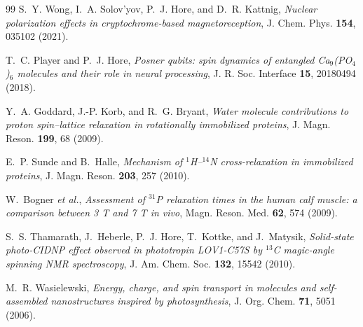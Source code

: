 \documentclass[aps,prx,reprint,superscriptaddress,nofootinbib,floatfix]{revtex4-2}
\begin{document}
\begin{thebibliography}{99}
 S.~Y. Wong, I.~A. Solov'yov, P.~J. Hore, and D.~R. Kattnig,
\textit{Nuclear polarization effects in cryptochrome-based magnetoreception},
J. Chem. Phys. \textbf{154}, 035102 (2021).

 T.~C. Player and P.~J. Hore,
\textit{Posner qubits: spin dynamics of entangled Ca$_9$(PO$_4$)$_6$ molecules
and their role in neural processing},
J. R. Soc. Interface \textbf{15}, 20180494 (2018).

 Y.~A. Goddard, J.-P. Korb, and R.~G. Bryant,
\textit{Water molecule contributions to proton spin--lattice relaxation in
rotationally immobilized proteins},
J. Magn. Reson. \textbf{199}, 68 (2009).

 E.~P. Sunde and B.~Halle,
\textit{Mechanism of $^1$H--$^{14}$N cross-relaxation in immobilized proteins},
J. Magn. Reson. \textbf{203}, 257 (2010).

 W.~Bogner \textit{et al.},
\textit{Assessment of $^{31}$P relaxation times in the human calf muscle: a
comparison between 3 T and 7 T in vivo},
Magn. Reson. Med. \textbf{62}, 574 (2009).

 S.~S. Thamarath, J.~Heberle, P.~J. Hore, T.~Kottke, and
J.~Matysik,
\textit{Solid-state photo-CIDNP effect observed in phototropin LOV1-C57S by
$^{13}$C magic-angle spinning NMR spectroscopy},
J. Am. Chem. Soc. \textbf{132}, 15542 (2010).

 M.~R. Wasielewski,
\textit{Energy, charge, and spin transport in molecules and self-assembled
nanostructures inspired by photosynthesis},
J. Org. Chem. \textbf{71}, 5051 (2006).

\end{thebibliography}
\end{document}
